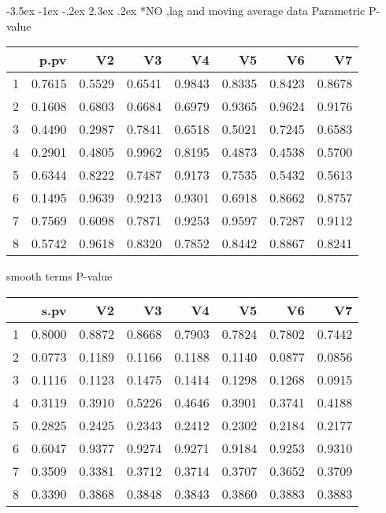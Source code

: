 \documentclass[a4paper, 12pt]{article}
\makeatletter
\def\Large{\fontsize{16}{24}\selectfont}
\renewcommand\section{\@startsection {section}{1}{\z@}%
                                   {-3.5ex \@plus -1ex \@minus -.2ex}%
                                   {2.3ex \@plus.2ex}%
                                   {\centering\normalfont\Large\bfseries}}
\makeatother
\begin{document}
\section*{NO ,lag and moving average data}
Parametric P-value
\begin{table}[ht]
\centering
\begin{tabular}{rrrrrrrr}
  \hline
 & p.pv & V2 & V3 & V4 & V5 & V6 & V7 \\
  \hline
1 & 0.7615 & 0.5529 & 0.6541 & 0.9843 & 0.8335 & 0.8423 & 0.8678 \\
  2 & 0.1608 & 0.6803 & 0.6684 & 0.6979 & 0.9365 & 0.9624 & 0.9176 \\
  3 & 0.4490 & 0.2987 & 0.7841 & 0.6518 & 0.5021 & 0.7245 & 0.6583 \\
  4 & 0.2901 & 0.4805 & 0.9962 & 0.8195 & 0.4873 & 0.4538 & 0.5700 \\
  5 & 0.6344 & 0.8222 & 0.7487 & 0.9173 & 0.7535 & 0.5432 & 0.5613 \\
  6 & 0.1495 & 0.9639 & 0.9213 & 0.9301 & 0.6918 & 0.8662 & 0.8757 \\
  7 & 0.7569 & 0.6098 & 0.7871 & 0.9253 & 0.9597 & 0.7287 & 0.9112 \\
  8 & 0.5742 & 0.9618 & 0.8320 & 0.7852 & 0.8442 & 0.8867 & 0.8241 \\
   \hline
\end{tabular}
\end{table}

smooth terms P-value
\begin{table}[ht]
\centering
\begin{tabular}{rrrrrrrr}
  \hline
 & s.pv & V2 & V3 & V4 & V5 & V6 & V7 \\
  \hline
1 & 0.8000 & 0.8872 & 0.8668 & 0.7903 & 0.7824 & 0.7802 & 0.7442 \\
  2 & 0.0773 & 0.1189 & 0.1166 & 0.1188 & 0.1140 & 0.0877 & 0.0856 \\
  3 & 0.1116 & 0.1123 & 0.1475 & 0.1414 & 0.1298 & 0.1268 & 0.0915 \\
  4 & 0.3119 & 0.3910 & 0.5226 & 0.4646 & 0.3901 & 0.3741 & 0.4188 \\
  5 & 0.2825 & 0.2425 & 0.2343 & 0.2412 & 0.2302 & 0.2184 & 0.2177 \\
  6 & 0.6047 & 0.9377 & 0.9274 & 0.9271 & 0.9184 & 0.9253 & 0.9310 \\
  7 & 0.3509 & 0.3381 & 0.3712 & 0.3714 & 0.3707 & 0.3652 & 0.3709 \\
  8 & 0.3390 & 0.3868 & 0.3848 & 0.3843 & 0.3860 & 0.3883 & 0.3883 \\
   \hline
\end{tabular}
\end{table}
\end{document}
